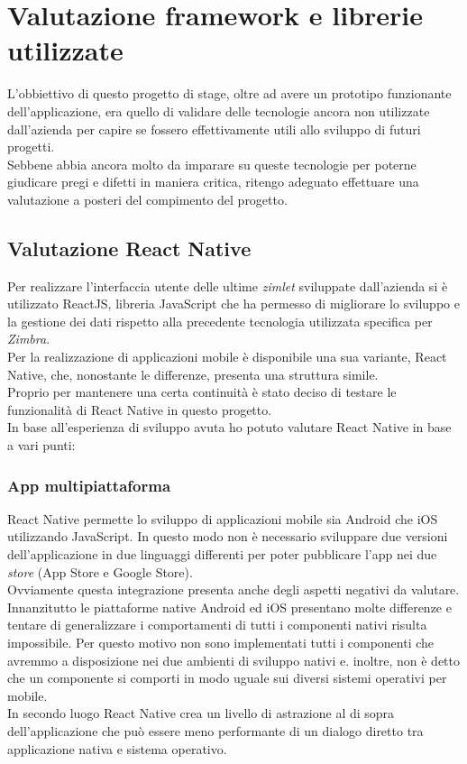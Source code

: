 \section{Valutazione framework e librerie utilizzate}
L'obbiettivo di questo progetto di stage, oltre ad avere un prototipo funzionante dell'applicazione, era quello di validare delle tecnologie ancora non utilizzate dall'azienda per capire se fossero effettivamente utili allo sviluppo di futuri progetti. \\
Sebbene abbia ancora molto da imparare su queste tecnologie per poterne giudicare pregi e difetti in maniera critica, ritengo adeguato effettuare una valutazione a posteri del compimento del progetto.
\subsection{Valutazione React Native}
Per realizzare l'interfaccia utente delle ultime \emph{zimlet} sviluppate dall'azienda si è utilizzato ReactJS, libreria JavaScript che ha permesso di migliorare lo sviluppo e la gestione dei dati rispetto alla precedente tecnologia utilizzata specifica per \emph{Zimbra}. \\
Per la realizzazione di applicazioni mobile è disponibile una sua variante, React Native, che, nonostante le differenze, presenta una struttura simile. \\
Proprio per mantenere una certa continuità è stato deciso di testare le funzionalità di React Native in questo progetto. \\
In base all'esperienza di sviluppo avuta ho potuto valutare React Native in base a vari punti:
\subsubsection{App multipiattaforma}
React Native permette lo sviluppo di applicazioni mobile sia Android che iOS utilizzando JavaScript. In questo modo non è necessario sviluppare due versioni dell'applicazione in due linguaggi differenti per poter pubblicare l'app nei due \emph{store} (App Store e Google Store). \\
Ovviamente questa integrazione presenta anche degli aspetti negativi da valutare. Innanzitutto le piattaforme native Android ed iOS presentano molte differenze e tentare di generalizzare i comportamenti di tutti i componenti nativi risulta impossibile. Per questo motivo non sono implementati tutti i componenti che avremmo a disposizione nei due ambienti di sviluppo nativi e. inoltre, non è detto che un componente si comporti in modo uguale sui diversi sistemi operativi per mobile. \\
In secondo luogo React Native crea un livello di astrazione al di sopra dell’applicazione che può essere meno performante di un dialogo diretto tra applicazione nativa e sistema operativo.
